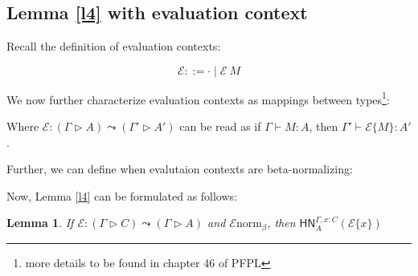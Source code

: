 \documentclass{article}
\newtheorem{lem}[thm]{Lemma}
\newcommand{\hasEF}[3]{\ensuremath{#1 \vdash #2 : #3}}
\newcommand{\hasC}[5]{\ensuremath{#1 : (#2 \rhd #3) \leadsto (#4 \rhd #5)}}
\newcommand{\bnorm}[1]{\ensuremath{#1 \mathrel{\text{norm}_\beta}}}
\newcommand{\hnorm}[3]{\ensuremath{\mathsf{HN}^{#1}_{#2}(#3)}}
\newcommand{\fillin}[2]{\ensuremath{#1\{#2\}}}
\newcommand{\fn}[2]{\ensuremath{#1 \to #2}}
\newcommand{\ap}[2]{\ensuremath{#1\ #2}}
\newcommand{\E}{\mathcal{E}}
\begin{document}
\subsection{Lemma \ref{l4} with evaluation context}

Recall the definition of evaluation contexts: 

\[
  \E ::= \cdot \mid \ap{\E}{M}
\]

We now further characterize evaluation contexts as mappings between types\footnote{more details to be found in chapter
46 of PFPL}: 

Where \hasC{\E}{\Gamma}{A}{\Gamma'}{A'} can be read as if \hasEF{\Gamma}{M}{A}, then \hasEF{\Gamma'}{\fillin{\E}{M}}{A'}.

Further, we can define when evalutaion contexts are beta-normalizing:


Now, Lemma \ref{l4} can be formulated as follows:

\begin{lem}\label{l5}
If \hasC{\E}{\Gamma}{C}{\Gamma}{A} and \bnorm{\E},
then \hnorm{\Gamma, x : C}{A}{\fillin{\E}{x}}
\end{lem}
\end{document}
